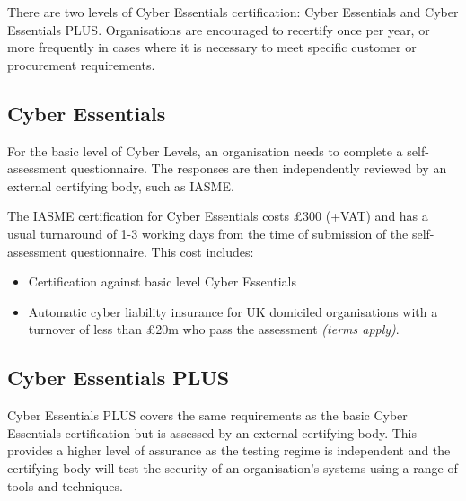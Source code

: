 \documentclass[12pt]{article}
\begin{document}
There are two levels of Cyber Essentials certification: Cyber Essentials and Cyber Essentials PLUS. Organisations are encouraged to recertify once per year, or more frequently in cases where it is necessary to meet specific customer or procurement requirements.

\subsection*{Cyber Essentials}
For the basic level of Cyber Levels, an organisation needs to complete a self-assessment questionnaire. The responses are then independently reviewed by an external certifying body, such as IASME.

The IASME certification for Cyber Essentials costs £300 (+VAT) and has a usual turnaround of 1-3 working days from the time of submission of the self-assessment questionnaire. This cost includes:
\begin{itemize}
  \item Certification against basic level Cyber Essentials
  \item Automatic cyber liability insurance for UK domiciled organisations with a turnover of less than £20m who pass the assessment \textit{(terms apply)}.
\end{itemize}

\subsection*{Cyber Essentials PLUS}
Cyber Essentials PLUS covers the same requirements as the basic Cyber Essentials certification but is assessed by an external certifying body. This provides a higher level of assurance as the testing regime is independent and the certifying body will test the security of an organisation's systems using a range of tools and techniques.


\section*{}

\section*{}

\section*{}
\end{document}
